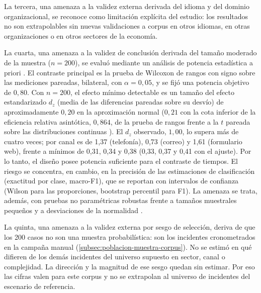 La tercera, una amenaza a la validez externa derivada del idioma y del dominio organizacional, se reconoce como limitación explícita del estudio: los resultados no son extrapolables sin nuevas validaciones a corpus en otros idiomas, en otras organizaciones o en otros sectores de la economía.

La cuarta, una amenaza a la validez de conclusión derivada del tamaño moderado de la muestra (\(n = 200\)), se evaluó mediante un análisis de potencia estadística a priori \parencite{Cohen1988_power_analysis}. El contraste principal es la prueba de Wilcoxon de rangos con signo sobre las mediciones pareadas, bilateral, con \(\alpha = 0{,}05\), y se fijó una potencia objetivo de \(0{,}80\). Con \(n = 200\), el efecto mínimo detectable es un tamaño del efecto estandarizado \(d_z\) (media de las diferencias pareadas sobre su desvío) de aproximadamente \(0{,}20\) en la aproximación normal (\(0{,}21\) con la cota inferior de la eficiencia relativa asintótica, \(0{,}864\), de la prueba de rangos frente a la \(t\) pareada sobre las distribuciones continuas \parencite{Hodges1956_efficiency}). El \(d_z\) observado, \(1{,}00\), lo supera más de cuatro veces; por canal es de 1,37 (telefonía), 0,73 (correo) y 1,61 (formulario web), frente a mínimos de 0,31, 0,34 y 0,38 (0,33, 0,37 y 0,41 con el ajuste). Por lo tanto, el diseño posee potencia suficiente para el contraste de tiempos. El riesgo se concentra, en cambio, en la precisión de las estimaciones de clasificación (exactitud por clase, macro-F1), que se reportan con intervalos de confianza (Wilson para las proporciones, bootstrap percentil para F1). La amenaza se trata, además, con pruebas no paramétricas robustas frente a tamaños muestrales pequeños y a desviaciones de la normalidad \parencite{HernandezSampieri2018_metodologia}.

La quinta, una amenaza a la validez externa por sesgo de selección, deriva de que los 200 casos no son una muestra probabilística: son los incidentes cronometrados en la campaña manual (\autoref{subsec:poblacion-muestra-corpus}). No se estimó en qué difieren de los demás incidentes del universo supuesto en sector, canal o complejidad. La dirección y la magnitud de ese sesgo quedan sin estimar. Por eso las cifras valen para este corpus y no se extrapolan al universo de incidentes del escenario de referencia.

